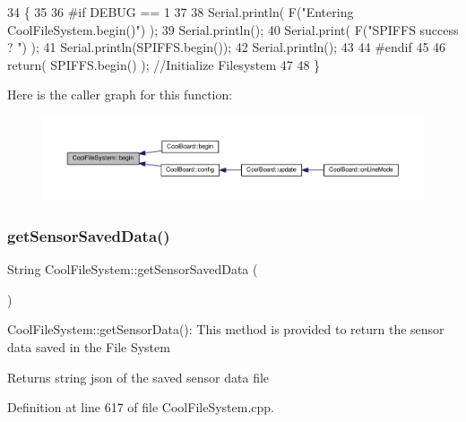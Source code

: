 \begin{DoxyCode}
34 \{
35 
36 \textcolor{preprocessor}{#if DEBUG == 1}
37 
38     Serial.println( F(\textcolor{stringliteral}{"Entering CoolFileSystem.begin()"}) );
39     Serial.println();   
40     Serial.print( F(\textcolor{stringliteral}{"SPIFFS success ? "}) );
41     Serial.println(SPIFFS.begin());
42     Serial.println();
43 
44 \textcolor{preprocessor}{#endif}
45 
46     \textcolor{keywordflow}{return}( SPIFFS.begin() );                                   \textcolor{comment}{//Initialize Filesystem}
47 
48 \}
\end{DoxyCode}
Here is the caller graph for this function\+:
\nopagebreak
\begin{figure}[H]
\begin{center}
\leavevmode
\includegraphics[width=350pt]{classCoolFileSystem_a6ba6f666ed4c530174f8569d2c636748_icgraph}
\end{center}
\end{figure}
\mbox{\label{classCoolFileSystem_a5c58bca3735c0ed3efb268d70ef998ef}} 
\subsubsection{\texorpdfstring{get\+Sensor\+Saved\+Data()}{getSensorSavedData()}}
{\footnotesize\ttfamily String Cool\+File\+System\+::get\+Sensor\+Saved\+Data (\begin{DoxyParamCaption}{ }\end{DoxyParamCaption})}

Cool\+File\+System\+::get\+Sensor\+Data()\+: This method is provided to return the sensor data saved in the File System

\begin{DoxyReturn}{Returns}
string json of the saved sensor data file 
\end{DoxyReturn}


Definition at line 617 of file Cool\+File\+System.\+cpp.




